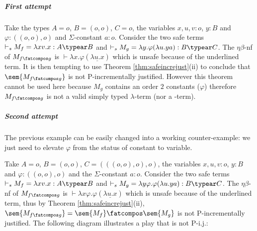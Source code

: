 \subparagraph{First attempt}

Take the types $A=o$, $B=(o,o)$, $C=o$, the variables
$x,u,v:o$, $y:B$ and $\varphi:((o,o),o)$ and $\Sigma$-constant $a:o$.
Consider the two safe terms $\vdash_s  M_f = \lambda xv.x : A\typear B$ and $\vdash_s M_g = \lambda y . \varphi (\lambda u . y a) : B\typear C$.
The $\eta\beta$-nf of $M_{f\fatcompos g}$ is $\vdash \lambda x . \varphi (\underline{\lambda u . x})$ which is unsafe because of the underlined term. It is then tempting to use
Theorem \ref{thm:safeincrejust}(ii) to conclude that
$\sem{M_{f\fatcompos g}}$ is not P-incrementally justified. However this theorem cannot be used here because $M_g$ contains an order $2$ constants ($\varphi$) therefore
$M_{f\fatcompos g}$ is not a valid simply typed $\lambda$-term (nor a \pcf-term).

\subparagraph{Second attempt} The previous example can be easily
changed into a working counter-example: we just need to elevate
$\varphi$ from the status of constant to variable.

Take $A=o$, $B=(o,o)$, $C=(((o,o),o),o)$, the variables
$x,u,v:o$, $y:B$ and $\varphi:((o,o),o)$ and the $\Sigma$-constant $a:o$. Consider the two safe terms $\vdash_s  M_f = \lambda xv.x : A\typear B$ and  $\vdash_s M_g = \lambda y \varphi. \varphi (\lambda u . y a) : B\typear C$.
The $\eta\beta$-nf of $M_{f\fatcompos g}$ is $\vdash \lambda x \varphi. \varphi (\underline{\lambda u . x})$ which is unsafe because of the underlined term, thus by Theorem \ref{thm:safeincrejust}(ii), $\sem{M_{f\fatcompos g}}=\sem{M_f} \fatcompos
\sem{M_g}$ is not P-incrementally justified. The following diagram illustrates a play that is not P-i.j.:

